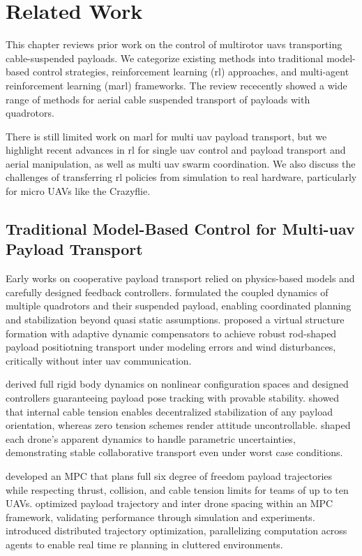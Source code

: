 \chapter{Related Work}
This chapter reviews prior work on the control of multirotor \gls{uav}s transporting cable-suspended payloads. We categorize existing methods into traditional model-based control strategies, reinforcement learning (\gls{rl}) approaches, and multi-agent reinforcement learning (\gls{marl}) frameworks. The review \cite{estevez_review_2024} rececently showed a wide range of methods for aerial cable suspended transport of payloads with quadrotors. 

There is still limited work on \gls{marl} for multi \gls{uav} payload transport, but we highlight recent advances in \gls{rl} for single \gls{uav} control and payload transport and aerial manipulation, as well as multi \gls{uav} swarm coordination. We also discuss the challenges of transferring \gls{rl} policies from simulation to real hardware, particularly for micro UAVs like the Crazyflie.

\section{Traditional Model-Based Control for Multi-\gls{uav} Payload Transport}
Early works on cooperative payload transport relied on physics-based models and carefully designed feedback controllers. \cite{sreenath_dynamics_2013} formulated the coupled dynamics of multiple quadrotors and their suspended payload, enabling coordinated planning and stabilization beyond quasi static assumptions. \cite{villa_cooperative_2021} proposed a virtual structure formation with adaptive dynamic compensators to achieve robust rod-shaped payload positiotning transport under modeling errors and wind disturbances, critically without inter \gls{uav} communication.

\cite{lee_geometric_2018} derived full rigid body dynamics on nonlinear configuration spaces and designed controllers guaranteeing payload pose tracking with provable stability. \cite{tognon_aerial_2018} showed that internal cable tension enables decentralized stabilization of any payload orientation, whereas zero tension schemes render attitude uncontrollable. \cite{tagliabue_robust_2017} shaped each drone’s apparent dynamics to handle parametric uncertainties, demonstrating stable collaborative transport even under worst case conditions.

\cite{sun_nonlinear_2023} developed an MPC that plans full six degree of freedom payload trajectories while respecting thrust, collision, and cable tension limits for teams of up to ten UAVs. \cite{li_nonlinear_2023} optimized payload trajectory and inter drone spacing within an MPC framework, validating performance through simulation and experiments. \cite{jackson_scalable_2020} introduced distributed trajectory optimization, parallelizing computation across agents to enable real time re planning in cluttered environments.

